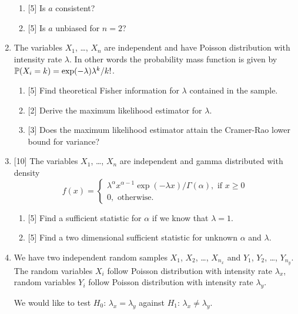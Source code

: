 \begin{enumerate}
    \begin{enumerate}
      \item {[5]} Is $\hat a$ consistent?
      \item {[5]} Is $\hat a$ unbiased for $n=2$?
    \end{enumerate}

    \item The variables $X_1$, \ldots, $X_n$ are independent and have Poisson distribution with intensity rate $\lambda$.
    In other words the probability mass function is given by $\P(X_i = k) = \exp(-\lambda) \lambda^k / k!$.
    
    \begin{enumerate}
      \item {[5]} Find theoretical Fisher information for $\lambda$ contained in the sample. 
      \item {[2]} Derive the maximum likelihood estimator for $\lambda$.
      \item {[3]} Does the maximum likelihood estimator attain the Cramer-Rao lower bound for variance? 
    \end{enumerate}

    \item {[10]} The variables $X_1$, \ldots, $X_n$ are independent and gamma distributed with density
    \[
    f(x) = \begin{cases}
      \lambda^\alpha x^{\alpha - 1} \exp(-\lambda x) / \Gamma(\alpha), \text{ if } x\geq 0 \\
      0, \text{ otherwise}.
    \end{cases}  
    \]
    \begin{enumerate}
      \item {[5]} Find a sufficient statistic for $\alpha$ if we know that $\lambda = 1$. 
      \item {[5]} Find a two dimensional sufficient statistic for unknown $\alpha$ and $\lambda$. 
    \end{enumerate}

    \item We have two independent random samples $X_1$, $X_2$, \ldots, $X_{n_x}$ and $Y_1$, $Y_2$, \ldots, $Y_{n_y}$.
    The random variables $X_i$ follow Poisson distribution with intensity rate $\lambda_x$, 
    random variables $Y_i$ follow Poisson distribution with intensity rate $\lambda_y$.
  
    We would like to test $H_0$: $\lambda_x = \lambda_y$ against $H_1$: $\lambda_x \neq \lambda_y$.
  

\end{enumerate}
